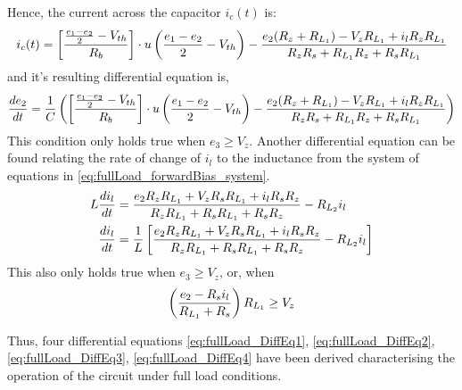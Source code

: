 Hence, the current across the capacitor $i_c(t)$ is:
\begin{equation}
	i_c(t) = \left[\frac{\frac{e_1 - e_2}{2} - V_{th}}{R_b} \right]\cdot u\left(\frac{e_1 - e_2}{2} - V_{th} \right) - \frac{e_2 (R_z + R_{L_1}) - V_z R_{L_1} + i_l R_z R_{L_1}}{R_z R_s + R_{L_1} R_z + R_s R_{L_1}}
\end{equation}
and it's resulting differential equation is,
\begin{equation}
	\frac{de_2}{dt} = \frac{1}{C}\left(\left[\frac{\frac{e_1 - e_2}{2} - V_{th}}{R_b} \right]\cdot u\left(\frac{e_1 - e_2}{2} - V_{th} \right) - \frac{e_2 (R_z + R_{L_1}) - V_z R_{L_1} + i_l R_z R_{L_1}}{R_z R_s + R_{L_1} R_z + R_s R_{L_1}} \right)
	\label{eq:fullLoad_DiffEq3}
\end{equation}
This condition only holds true when $e_3 \geq V_z$. Another differential equation can be found relating the rate of change of $i_l$ to the inductance from the system of equations in \eqref{eq:fullLoad_forwardBias_system}.
\begin{equation}
	\begin{split}
		L\frac{di_l}{dt} &= \frac{e_2 R_z R_{L_1} + V_z R_s R_{L_1} + i_l R_s R_z}{R_z R_{L_1} + R_s R_{L_1} + R_s R_z} - R_{L_2}i_l \\
		 \frac{di_l}{dt} &= \frac{1}{L} \left[\frac{e_2 R_z R_{L_1} + V_z R_s R_{L_1} + i_l R_s R_z}{R_z R_{L_1} + R_s R_{L_1} + R_s R_z} - R_{L_2}i_l \right]
	\end{split}
	\label{eq:fullLoad_DiffEq4}
\end{equation}
This also only holds true when $e_3 \geq V_z$, or, when
\begin{equation}
	\left(\frac{e_2 - R_s i_l}{R_{L_1} + R_s} \right)R_{L_1} \geq V_z
\end{equation}

Thus, four differential equations \eqref{eq:fullLoad_DiffEq1}, \eqref{eq:fullLoad_DiffEq2}, \eqref{eq:fullLoad_DiffEq3}, \eqref{eq:fullLoad_DiffEq4} have been derived characterising the operation of the circuit under full load conditions.

